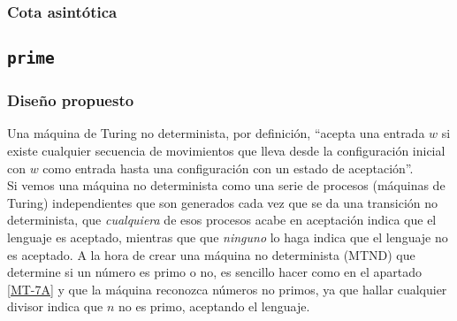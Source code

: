 





\subsubsection*{Cota asintótica}




\subsection{\texttt{prime}}

\subsubsection*{Diseño propuesto}
Una máquina de Turing no determinista, por definición, ``acepta una
entrada $w$ si existe cualquier secuencia de movimientos que lleva desde la configuración inicial con $w$ como entrada hasta una configuración con un estado de aceptación''.\parencite[][pg. 289]{HopcroftJohnE.2008Ialt}\\
Si vemos una máquina no determinista como una serie de procesos (máquinas de Turing) independientes que son generados cada vez que se da una transición no determinista, que \textit{cualquiera} de esos procesos acabe en aceptación indica que el lenguaje es aceptado, mientras que que \textit{ninguno} lo haga indica que el lenguaje no es aceptado. A la hora de crear una máquina no determinista (MTND) que determine si un número es primo o no, es sencillo hacer como en el apartado \ref{MT-7A} y que la máquina reconozca números no primos, ya que hallar cualquier divisor indica que $n$ no es primo, aceptando el lenguaje.\medskip

